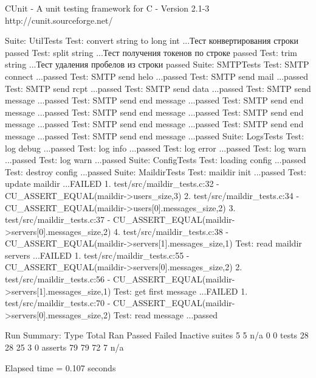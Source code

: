 

     CUnit - A unit testing framework for C - Version 2.1-3
     http://cunit.sourceforge.net/


Suite: UtilTests
  Test: convert string to long int ...Тест конвертирования строки
passed
  Test: split string ...Тест получения токенов по строке
passed
  Test: trim string ...Тест удаления пробелов из строки
passed
Suite: SMTPTests
  Test: SMTP connect ...passed
  Test: SMTP send helo ...passed
  Test: SMTP send mail ...passed
  Test: SMTP send rcpt ...passed
  Test: SMTP send data ...passed
  Test: SMTP send message ...passed
  Test: SMTP send end message ...passed
  Test: SMTP send end message ...passed
  Test: SMTP send end message ...passed
  Test: SMTP send end message ...passed
  Test: SMTP send end message ...passed
  Test: SMTP send end message ...passed
  Test: SMTP send end message ...passed
Suite: LogsTests
  Test: log debug ...passed
  Test: log info ...passed
  Test: log error ...passed
  Test: log warn ...passed
  Test: log warn ...passed
Suite: ConfigTests
  Test: loading config ...passed
  Test: destroy config ...passed
Suite: MaildirTests
  Test: maildir init ...passed
  Test: update maildir ...FAILED
    1. test/src/maildir_tests.c:32  - CU_ASSERT_EQUAL(maildir->users_size,3)
    2. test/src/maildir_tests.c:34  - CU_ASSERT_EQUAL(maildir->users[0].messages_size,2)
    3. test/src/maildir_tests.c:37  - CU_ASSERT_EQUAL(maildir->servers[0].messages_size,2)
    4. test/src/maildir_tests.c:38  - CU_ASSERT_EQUAL(maildir->servers[1].messages_size,1)
  Test: read maildir servers ...FAILED
    1. test/src/maildir_tests.c:55  - CU_ASSERT_EQUAL(maildir->servers[0].messages_size,2)
    2. test/src/maildir_tests.c:56  - CU_ASSERT_EQUAL(maildir->servers[1].messages_size,1)
  Test: get first message ...FAILED
    1. test/src/maildir_tests.c:70  - CU_ASSERT_EQUAL(maildir->servers[0].messages_size,2)
  Test: read message ...passed

Run Summary:    Type  Total    Ran Passed Failed Inactive
              suites      5      5    n/a      0        0
               tests     28     28     25      3        0
             asserts     79     79     72      7      n/a

Elapsed time =    0.107 seconds
